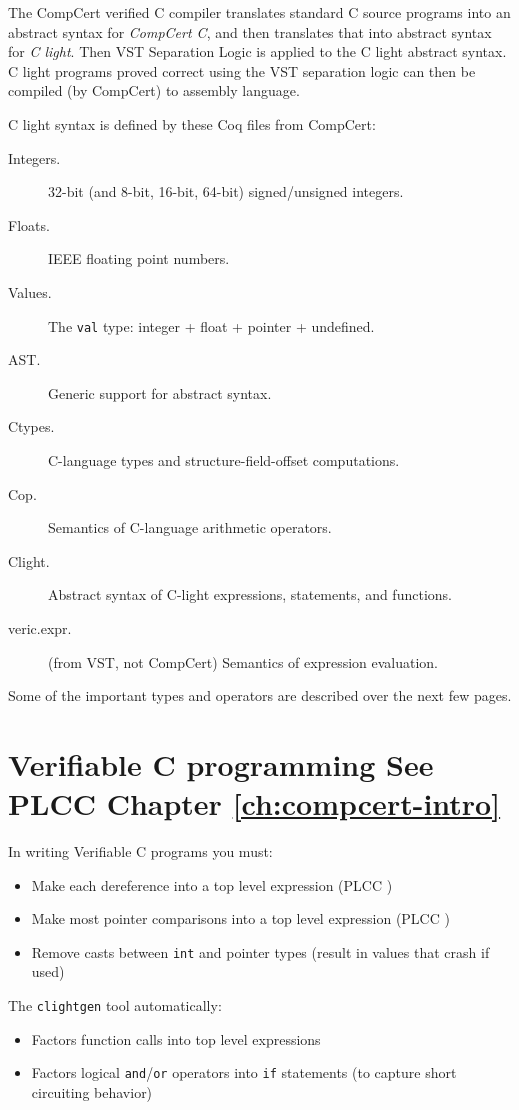 \documentclass[12pt,fleqn,openany,oneside,showtrims]{memoir}
\newcommand{\ychapter}[2]{\chapter[#1]{#1 \hfill \normalsize #2}}
\begin{document}
The CompCert verified C compiler translates standard C source programs
into an abstract syntax for \emph{CompCert C},
and then translates that into abstract syntax
for \emph{C light}.
Then VST Separation Logic is applied to the C light abstract syntax.
C light programs proved correct using the VST separation logic
can then be compiled (by CompCert) to assembly language.

C light syntax is defined by these Coq files from CompCert:

\begin{description}
\item[Integers.]  32-bit (and 8-bit, 16-bit, 64-bit) signed/unsigned integers.
\item[Floats.]  IEEE floating point numbers.
\item[Values.]  The \lstinline|val| type: integer + float + pointer + undefined.
\item[AST.]  Generic support for abstract syntax.
\item[Ctypes.]  C-language types and structure-field-offset computations.
\item[Cop.]  Semantics of C-language arithmetic operators.
\item[Clight.]  Abstract syntax of C-light expressions, statements, and functions.
\item[veric.expr.]  (from VST, not CompCert) Semantics of expression evaluation.
\end{description}

Some of the important types and operators are described over the next
few pages.

\ychapter{Verifiable C programming}{See PLCC Chapter \ref{ch:compcert-intro}}
\label{refcard:verifiable-c}
In writing Verifiable C programs you must:

\begin{itemize}
  \item Make each dereference into a top level expression (PLCC
  )
  \item Make most pointer comparisons into a top level expression (PLCC
  )
  \item Remove casts between \lstinline|int| and pointer types (result in
  values that crash if used)
\end{itemize}

The \lstinline{clightgen} tool automatically:

\begin{itemize}
  \item Factors function calls into top level expressions
  \item Factors logical \lstinline{and}/\lstinline{or} operators into
\lstinline{if} statements (to capture
  short circuiting behavior)
\end{itemize}
\end{document}
